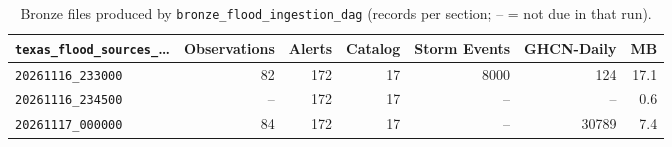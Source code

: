 \begin{table}[H]\centering\footnotesize
\caption{Bronze files produced by \texttt{bronze\_flood\_ingestion\_dag} (records per section; -- = not due in that run).}\label{tab:bronze}
\begin{tabular}{@{}lrrrrrr@{}}\toprule
\texttt{texas\_flood\_sources\_}\ldots & Observations & Alerts & Catalog & Storm Events & GHCN-Daily & MB\\\midrule
\texttt{20261116\_233000} & 82 & 172 & 17 & 8000 & 124 & 17.1\\
\texttt{20261116\_234500} & -- & 172 & 17 & -- & -- & 0.6\\
\texttt{20261117\_000000} & 84 & 172 & 17 & -- & 30789 & 7.4\\
\bottomrule\end{tabular}\end{table}